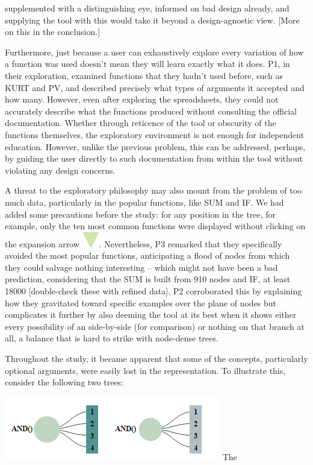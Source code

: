 \documentclass[conference]{IEEEtran}
\begin{document}
	supplemented with a distinguishing eye, informed on bad design already, and
	supplying the tool with this would take it beyond a design-agnostic view. [More
	on this in the conclusion.] \par Furthermore, just because a user can
	exhaustively explore every variation of how a function was used doesn't mean
	they will learn exactly what it does. P1, in their exploration, examined
	functions that they hadn't used before, such as KURT and PV, and described
	precisely what types of arguments it accepted and how many. However, even after
	exploring the spreadsheets, they could not accurately describe what the
	functions produced without consulting the official documentation. Whether
	through reticence of the tool or obscurity of the functions themselves, the
	exploratory environment is not enough for independent education. However,
	unlike the previous problem, this can be addressed, perhaps, by guiding the
	user directly to such documentation from within the tool without violating any
	design concerns. \par A threat to the exploratory philosophy may also mount
	from the problem of too much data, particularly in the popular functions, like
	SUM and IF. We had added some precautions before the study: for any position in
	the tree, for example, only the ten most common functions were displayed
	without clicking on the expansion arrow \includegraphics[scale=.35]{arrow}.
	Nevertheless, P3 remarked that they specifically avoided the most popular
	functions, anticipating a flood of nodes from which they could salvage nothing
	interesting -- which might not have been a bad prediction, considering that the
	SUM is built from 910 nodes and IF, at least 18000 [double-check these with
	refined data]. P2 corroborated this by explaining how they gravitated toward
	specific examples over the plane of nodes but complicates it further by also
	deeming the tool at its best when it shows either every possibility of an
	side-by-side (for comparison) or nothing on that branch at all, a balance that
	is hard to strike with node-dense trees. \par Throughout the study, it became
	apparent that some of the concepts, particularly optional arguments, were
	easily lost in the representation. To illustrate this, consider the following
	two trees: \par \includegraphics[width = .46\textwidth]{comparison} The
\end{document}
